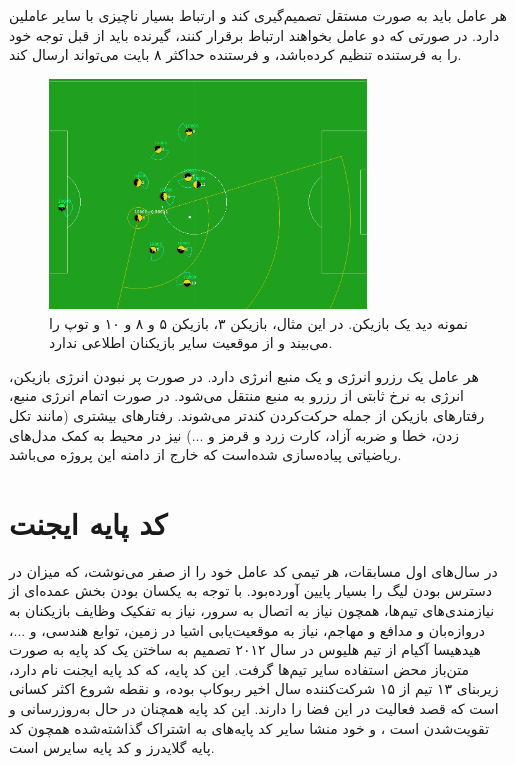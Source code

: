 هر عامل باید به صورت مستقل تصمیم‌گیری کند و ارتباط بسیار ناچیزی با سایر عاملین دارد.
در صورتی که دو عامل بخواهند ارتباط برقرار کنند، گیرنده باید از قبل توجه خود را به فرستنده تنظیم کرده‌باشد، و فرستنده حداکثر ۸ بایت می‌تواند ارسال کند.

\begin{figure}[H]
\centering
\includegraphics[width=0.75\textwidth]{images/view.png}
\caption{نمونه دید یک بازیکن. در این مثال، بازیکن ۳، بازیکن ۵ و ۸ و ۱۰ و توپ را می‌بیند و از موقعیت سایر بازیکنان اطلاعی ندارد.}\label{fig:view}
    
\end{figure}

هر عامل یک رزرو انرژی و یک منبع انرژی دارد. در صورت پر نبودن انرژی بازیکن، انرژی به نرخ ثابتی از رزرو به منبع منتقل می‌شود.
در صورت اتمام انرژی منبع، رفتار‌های بازیکن از جمله حرکت‌کردن کند‌تر می‌شوند.
رفتار‌های بیشتری (مانند تکل زدن، خطا و ضربه‌ آزاد، کارت زرد و قرمز و ...) 
نیز در محیط به کمک مدل‌های ریاضیاتی پیاده‌سازی شده‌است که خارج از دامنه این پروژه می‌باشد.

\section{کد پایه ایجنت}
در سال‌های اول مسابقات، هر تیمی کد عامل خود را از صفر می‌نوشت، که میزان در دسترس بودن لیگ را بسیار پایین آورده‌بود. با توجه به یکسان بودن بخش عمده‌ای از نیازمندی‌های تیم‌ها،
همچون نیاز به اتصال به سرور، نیاز به تفکیک وظایف بازیکنان به دروازه‌بان و مدافع و مهاجم، نیاز به موقعیت‌یابی اشیا در زمین، توابع هندسی، و ...، هیدهیسا آکیام از تیم هلیوس در سال ۲۰۱۲ تصمیم به ساختن یک کد پایه به صورت متن‌باز محض استفاده سایر تیم‌ها گرفت.
این کد پایه، که کد پایه ایجنت نام دارد، زیربنای ۱۳ تیم از ۱۵ شرکت‌کننده سال اخیر ربوکاپ بوده، و نقطه شروع اکثر کسانی است که قصد فعالیت در این فضا را دارند.
این کد پایه همچنان در حال به‌روز‌رسانی و تقویت‌شدن است
، و خود منشا سایر کد پایه‌های به اشتراک گذاشته‌شده همچون کد پایه گلایدرز
 و کد پایه سایرس
  است.

